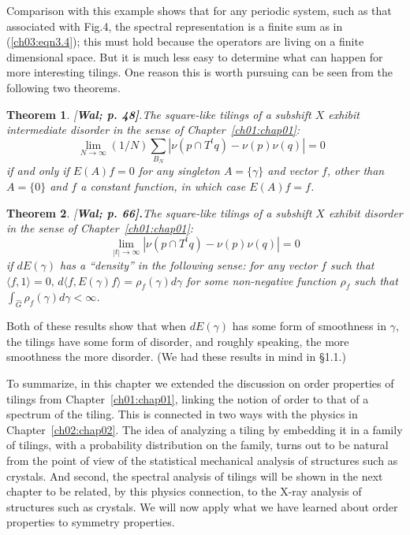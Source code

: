 \documentclass[reqno]{stml-l}
\theoremstyle{plain}
\newtheorem{theorem}{Theorem}[chapter]
\theoremstyle{definition}
\numberwithin{equation}{chapter}
\begin{document}
Comparison with this example shows that for any periodic system, such as that associated with Fig.4, the spectral representation is a finite sum as in (\ref{ch03:eqn3.4}); this must hold because the operators are living on a finite dimensional space. But it is much less easy to determine what can happen for more interesting tilings. One reason this is worth pursuing can be seen from the following two theorems.

\begin{theorem}{\emph{[}\bf Wal; p. 48]}.\label{ch03:thm3.2}
The square-like tilings of a subshift $X$ exhibit intermediate disorder in the sense of Chapter~\ref{ch01:chap01}:
\begin{equation}
\lim_{N\rightarrow\infty}(1/N)\sum\limits_{B_{N}}|\nu(p\cap T^{t}q)-\nu(p)\nu(q)|=0\text{ }\label{ch03:eqn3.6}
\end{equation}if and only if $E(A)f=0$ for any singleton $A=\{\gamma\}$ and vector $f$, other than $A=\{0\}$ and $f$ a constant function, in which case $E(A)f=f$.
\end{theorem}
\begin{theorem}{\emph{[}\bf Wal; p. 66].}\label{ch03:thm3.3}
The square-like tilings of a subshift $X$ exhibit disorder in the sense of Chapter~\ref{ch01:chap01}:
\begin{equation}
\lim_{|t|\rightarrow\infty}|\nu(p\cap T^{t}q)-\nu(p)\nu(q)|=0\label{ch03:eqn3.7}
\end{equation}
if $dE(\gamma)$ has a ``density'' in the following sense: for any vector $f$ such that $\langle f,1\rangle=0,\,d\langle f, E(\gamma)f\rangle=\rho_{f}(\gamma)d\gamma$ for some non-negative function $\rho_{f}$ such that $\int_{\hat{G}}\rho_{f}(\gamma)d\gamma<\infty$.
\end{theorem}

Both of these results show that when $dE(\gamma)$ has some form of smoothness in $\gamma$, the tilings have some form of disorder, and roughly speaking, the more smoothness the more disorder. (We had these results in mind in \S 1.1.)

To summarize, in this chapter we extended the discussion on order properties of tilings from Chapter~\ref{ch01:chap01}, linking the notion of order to that of a spectrum of the tiling. This is connected in two ways with the physics in Chapter~\ref{ch02:chap02}. The idea of analyzing a tiling by embedding it in a family of tilings, with a probability distribution on the family, turns out to be natural from the point of view of the statistical mechanical analysis of structures such as crystals. And second, the spectral analysis of tilings will be shown in the next chapter to be related, by this physics connection, to the X-ray analysis of structures such as crystals. We will now apply what we have learned about order properties to symmetry properties.
\end{document}
